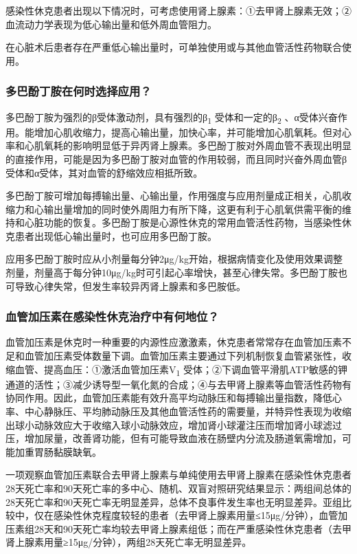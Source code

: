 感染性休克患者出现以下情况时，可考虑使用肾上腺素：①去甲肾上腺素无效；②血流动力学表现为低心输出量和低外周血管阻力。

在心脏术后患者存在严重低心输出量时，可单独使用或与其他血管活性药物联合使用。

\subsubsection{多巴酚丁胺在何时选择应用？}

多巴酚丁胺为强烈的β受体激动剂，具有强烈的β\textsubscript{1}
受体和一定的β\textsubscript{2}
、α受体兴奋作用。能增加心肌收缩力，提高心输出量，加快心率，并可能增加心肌氧耗。但对心率和心肌氧耗的影响明显低于异丙肾上腺素。多巴酚丁胺对外周血管不表现出明显的直接作用，可能是因为多巴酚丁胺对血管的作用较弱，而且同时兴奋外周血管β受体和α受体，其对血管的舒缩效应相抵所致。

多巴酚丁胺可增加每搏输出量、心输出量，作用强度与应用剂量成正相关，心肌收缩力和心输出量增加的同时使外周阻力有所下降，这更有利于心肌氧供需平衡的维持和心脏功能的恢复。多巴酚丁胺是心源性休克的常用血管活性药物，当感染性休克患者出现低心输出量时，也可应用多巴酚丁胺。

应用多巴酚丁胺时应从小剂量每分钟2μg/kg开始，根据病情变化及使用效果调整剂量，剂量高于每分钟10μg/kg时可引起心率增快，甚至心律失常。多巴酚丁胺也可导致心律失常，但发生率较异丙肾上腺素和多巴胺低。

\subsubsection{血管加压素在感染性休克治疗中有何地位？}

血管加压素是休克时一种重要的内源性应激激素，休克患者常常存在血管加压素不足和血管加压素受体数量下调。血管加压素主要通过下列机制恢复血管紧张性，收缩血管、提高血压：①激活血管加压素V\textsubscript{1}
受体；②下调血管平滑肌ATP敏感的钾通道的活性；③减少诱导型一氧化氮的合成；④与去甲肾上腺素等血管活性药物有协同作用。因此，血管加压素能有效升高平均动脉压和每搏输出量指数，降低心率、中心静脉压、平均肺动脉压及其他血管活性药的需要量，并特异性表现为收缩出球小动脉效应大于收缩入球小动脉效应，增加肾小球灌注压而增加肾小球滤过压，增加尿量，改善肾功能，但有可能导致血液在肠壁内分流及肠道氧需增加，可能加重胃肠黏膜缺氧。

一项观察血管加压素联合去甲肾上腺素与单纯使用去甲肾上腺素在感染性休克患者28天死亡率和90天死亡率的多中心、随机、双盲对照研究结果显示：两组间总体的28天死亡率和90天死亡率无明显差异，总体不良事件发生率也无明显差异。亚组比较中，仅在感染性休克程度较轻的患者（去甲肾上腺素用量≤15μg/分钟），血管加压素组28天和90天死亡率均较去甲肾上腺素组低；而在严重感染性休克患者（去甲肾上腺素用量≥15μg/分钟），两组28天死亡率无明显差异。

